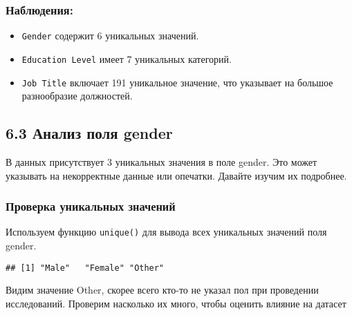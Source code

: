\documentclass[
]{article}
\newenvironment{Shaded}{\begin{snugshade}}{\end{snugshade}}
\newcommand{\CommentTok}[1]{\textcolor[rgb]{0.56,0.35,0.01}{\textit{#1}}}
\newcommand{\FunctionTok}[1]{\textcolor[rgb]{0.13,0.29,0.53}{\textbf{#1}}}
\newcommand{\NormalTok}[1]{#1}
\newcommand{\SpecialCharTok}[1]{\textcolor[rgb]{0.81,0.36,0.00}{\textbf{#1}}}
\providecommand{\tightlist}{%
  \setlength{\itemsep}{0pt}\setlength{\parskip}{0pt}}
\begin{document}
\subsubsection{Наблюдения:}\label{ux43dux430ux431ux43bux44eux434ux435ux43dux438ux44f-3}

\begin{itemize}
\tightlist
\item
  \texttt{Gender} содержит 6 уникальных значений.
\item
  \texttt{Education\ Level} имеет 7 уникальных категорий.
\item
  \texttt{Job\ Title} включает 191 уникальное значение, что указывает на
  большое разнообразие должностей.
\end{itemize}

\subsection{6.3 Анализ поля
gender}\label{ux430ux43dux430ux43bux438ux437-ux43fux43eux43bux44f-gender}

В данных присутствует 3 уникальных значения в поле gender. Это может
указывать на некорректные данные или опечатки. Давайте изучим их
подробнее.

\subsubsection{Проверка уникальных
значений}\label{ux43fux440ux43eux432ux435ux440ux43aux430-ux443ux43dux438ux43aux430ux43bux44cux43dux44bux445-ux437ux43dux430ux447ux435ux43dux438ux439}

Используем функцию \texttt{unique()} для вывода всех уникальных значений
поля gender.

\begin{Shaded}
\end{Shaded}

\begin{verbatim}
## [1] "Male"   "Female" "Other"
\end{verbatim}

Видим значение Other, скорее всего кто-то не указал пол при проведении
исследований. Проверим насколько их много, чтобы оценить влияние на
датасет

\begin{Shaded}
\end{Shaded}
\end{document}
